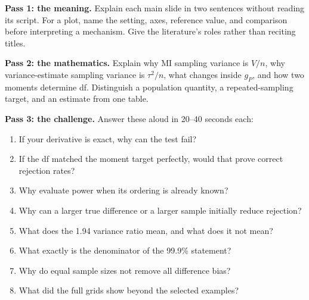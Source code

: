 \textbf{Pass 1: the meaning.} Explain each main slide in two sentences without reading its script. For a plot, name the setting, axes, reference value, and comparison before interpreting a mechanism. Give the literature's roles rather than reciting titles.

\textbf{Pass 2: the mathematics.} Explain why MI sampling variance is \(V/n\), why variance-estimate sampling variance is \(\tau^2/n\), what changes inside \(g_P\), and how two moments determine df. Distinguish a population quantity, a repeated-sampling target, and an estimate from one table.

\textbf{Pass 3: the challenge.} Answer these aloud in 20--40 seconds each:
\begin{enumerate}
\item If your derivative is exact, why can the test fail?
\item If the df matched the moment target perfectly, would that prove correct rejection rates?
\item Why evaluate power when its ordering is already known?
\item Why can a larger true difference or a larger sample initially reduce rejection?
\item What does the 1.94 variance ratio mean, and what does it not mean?
\item What exactly is the denominator of the 99.9\% statement?
\item Why do equal sample sizes not remove all difference bias?
\item What did the full grids show beyond the selected examples?
\end{enumerate}



